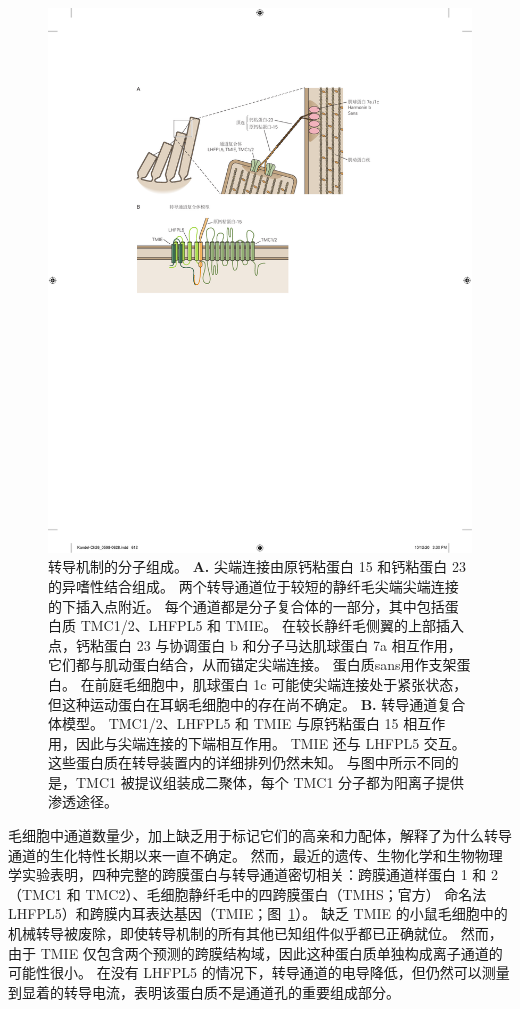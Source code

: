 \begin{figure}[htbp]
	\centering
	\includegraphics[width=1.0\linewidth]{chap26/fig_26_10}
	\caption{转导机制的分子组成。
		\textbf{A.} 尖端连接由原钙粘蛋白 15 和钙粘蛋白 23 的异嗜性结合组成。
		两个转导通道位于较短的静纤毛尖端尖端连接的下插入点附近。
		每个通道都是分子复合体的一部分，其中包括蛋白质 TMC1/2、LHFPL5 和 TMIE。
		在较长静纤毛侧翼的上部插入点，钙粘蛋白 23 与协调蛋白 b 和分子马达肌球蛋白 7a 相互作用，它们都与肌动蛋白结合，从而锚定尖端连接。
		蛋白质sans用作支架蛋白。
		在前庭毛细胞中，肌球蛋白 1c 可能使尖端连接处于紧张状态，但这种运动蛋白在耳蜗毛细胞中的存在尚不确定。
		\textbf{B.} 转导通道复合体模型。
		TMC1/2、LHFPL5 和 TMIE 与原钙粘蛋白 15 相互作用，因此与尖端连接的下端相互作用。
		TMIE 还与 LHFPL5 交互。
		这些蛋白质在转导装置内的详细排列仍然未知。
		与图中所示不同的是，TMC1 被提议组装成二聚体，每个 TMC1 分子都为阳离子提供渗透途径\cite{wu2016molecular,pan2018tmc1}。}
	\label{fig:26_10}
\end{figure}


毛细胞中通道数量少，加上缺乏用于标记它们的高亲和力配体，解释了为什么转导通道的生化特性长期以来一直不确定。
然而，最近的遗传、生物化学和生物物理学实验表明，四种完整的跨膜蛋白与转导通道密切相关：跨膜通道样蛋白 1 和 2（TMC1 和 TMC2）、毛细胞静纤毛中的四跨膜蛋白（TMHS；官方） 命名法 LHFPL5）和跨膜内耳表达基因（TMIE；图~\ref{fig:26_10}）。
缺乏 TMIE 的小鼠毛细胞中的机械转导被废除，即使转导机制的所有其他已知组件似乎都已正确就位。
然而，由于 TMIE 仅包含两个预测的跨膜结构域，因此这种蛋白质单独构成离子通道的可能性很小。
在没有 LHFPL5 的情况下，转导通道的电导降低，但仍然可以测量到显着的转导电流，表明该蛋白质不是通道孔的重要组成部分。



